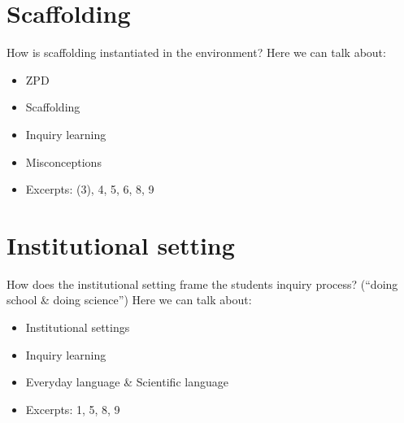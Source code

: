 \section{Scaffolding}
How is scaffolding instantiated in the environment?
Here we can talk about: 
\begin{itemize}
\item{ZPD}
\item{Scaffolding}
\item{Inquiry learning}
\item{Misconceptions}
\item{Excerpts: (3), 4, 5, 6, 8, 9}
\end{itemize}



\section{Institutional setting}
How does the institutional setting frame the students inquiry process? (“doing school \& doing science”)
Here we can talk about: 
\begin{itemize}
\item{Institutional settings}
\item{Inquiry learning}
\item{Everyday language \& Scientific language}
\item{Excerpts: 1, 5, 8, 9}
\end{itemize}

